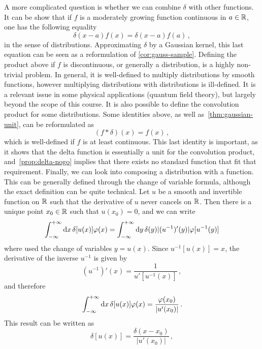 A more complicated question is whether we can combine $\delta$ with other functions. It
can be show that if $f$ is a moderately growing function continuous in $a\in\mathbb{R}$, one has
the following equality
\begin{equation}
  \label{eq:delta-times-f}
  \delta(x-a)f(x)=\delta(x-a)f(a)\,,
\end{equation}
in the sense of distributions. Approximating $\delta$ by a Gaussian kernel, this last
equation can be seen as a reformulation of \cref{cor:gauss-sample}. Defining the product
above if $f$ is discontinuous, or generally a distribution, is a highly non-trivial
problem. In general, it is well-defined to multiply distributions by smooth functions,
however multiplying distributions with distributions is ill-defined. It is a relevant
issue in some physical applications (\eg quantum field theory), but largely beyond the
scope of this course. It is also possible to define the convolution product for some
distributions. Some identities above, as well as~\cref{thm:gaussian-unit}, can be
reformulated as
\begin{equation}
  (f\ast\delta)(x)=f(x)\,,
\end{equation}
which is well-defined if $f$ is at least continuous. This last identity is important, as
it shows that the delta function is essentially a unit for the convolution product,
and~\cref{prop:delta-nogo} implies that there exists no standard function that fit that
requirement. Finally, we can look into composing a distribution with a function. This can
be generally defined through the change of variable formula, although the exact definition
can be quite technical. Let $u$ be a smooth and invertible function on $\mathbb{R}$ such that the
derivative of $u$ never cancels on $\mathbb{R}$. Then there is a unique point $x_0\in\mathbb{R}$ such that
$u(x_0)=0$, and we can write
\begin{equation}
  \int_{-\infty}^{+\infty}\mathrm{d}{x}\,\delta[u(x)]\varphi(x)=\int_{-\infty}^{+\infty}\mathrm{d}{y}\,\delta(y)|(u^{-1})'(y)|\varphi[u^{-1}(y)]
\end{equation}
where used the change of variables $y=u(x)$. Since $u^{-1}[u(x)]=x$, the derivative of the
inverse $u^{-1}$ is given by
\begin{equation}
  (u^{-1})'(x)=\frac{1}{u'[u^{-1}(x)]}\,,
\end{equation}
and therefore
\begin{equation}
  \int_{-\infty}^{+\infty}\mathrm{d}{x}\,\delta[u(x)]\varphi(x)=\frac{\varphi(x_0)}{|u'(x_0)|}\,.
\end{equation}
This result can be written as
\begin{equation}
  \delta[u(x)]=\frac{\delta(x-x_0)}{|u'(x_0)|}\,,
\end{equation}
